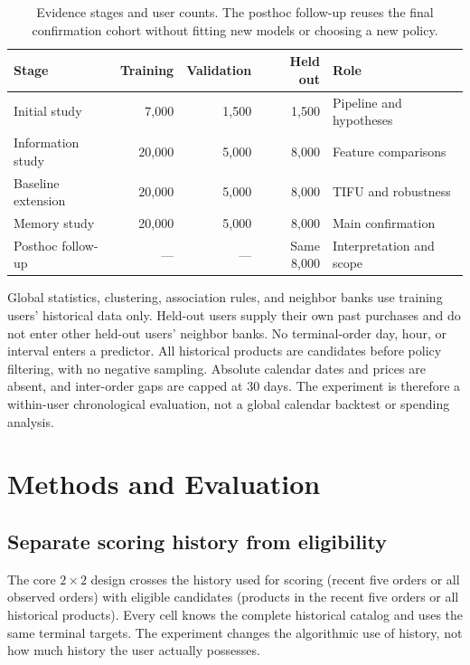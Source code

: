 \begin{table}[tbp]
  \centering
  \caption{Evidence stages and user counts. The posthoc follow-up reuses the final confirmation cohort without fitting new models or choosing a new policy.}
  \label{tab:cohorts}
  \small
  \begin{tabularx}{\linewidth}{@{}lrrrX@{}}
    \toprule
    Stage & Training & Validation & Held out & Role \\
    \midrule
    Initial study & 7,000 & 1,500 & 1,500 & Pipeline and hypotheses \\
    Information study & 20,000 & 5,000 & 8,000 & Feature comparisons \\
    Baseline extension & 20,000 & 5,000 & 8,000 & TIFU and robustness \\
    Memory study & 20,000 & 5,000 & 8,000 & Main confirmation \\
    Posthoc follow-up & --- & --- & Same 8,000 & Interpretation and scope \\
    \bottomrule
  \end{tabularx}
\end{table}

Global statistics, clustering, association rules, and neighbor banks use training users' historical data only. Held-out users supply their own past purchases and do not enter other held-out users' neighbor banks. No terminal-order day, hour, or interval enters a predictor. All historical products are candidates before policy filtering, with no negative sampling. Absolute calendar dates and prices are absent, and inter-order gaps are capped at 30 days. The experiment is therefore a within-user chronological evaluation, not a global calendar backtest or spending analysis.

\section{Methods and Evaluation}
\label{sec:methods}

\subsection{Separate scoring history from eligibility}
The core $2\times2$ design crosses the history used for scoring (recent five orders or all observed orders) with eligible candidates (products in the recent five orders or all historical products). Every cell knows the complete historical catalog and uses the same terminal targets. The experiment changes the algorithmic use of history, not how much history the user actually possesses.

